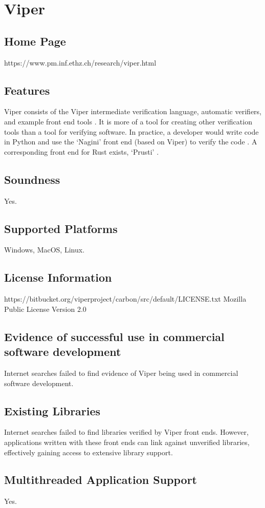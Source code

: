 \documentclass[12pt,openany,a4paper]{book}
\begin{document}
\section{Viper}
	\subsection{Home Page}%
https://www.pm.inf.ethz.ch/research/viper.html
	\subsection{Features}
		Viper consists of the Viper intermediate verification language, automatic verifiers, and example front end tools \cite{viper01}. It is more of a tool for creating other verification tools than a tool for verifying software. In practice, a developer would write code in Python and use the `Nagini' front end (based on Viper) to verify the code \cite{Eilers2018NaginiAS}. A corresponding front end for Rust exists, `Prusti' \cite{AstrauskasMuellerPoliSummers19}.
	\subsection{Soundness}
		Yes.
	\subsection{Supported Platforms}
		Windows, MacOS, Linux\cite{JuhaszUri2014VAVI}.
	\subsection{License Information}
	https://bitbucket.org/viperproject/carbon/src/default/LICENSE.txt
		Mozilla Public License Version 2.0\cite{viperlicense}
	\subsection{Evidence of successful use in commercial software development}
		Internet searches failed to find evidence of Viper being used in commercial software development.
	\subsection{Existing Libraries}
		Internet searches failed to find libraries verified by Viper front ends. However, applications written with these front ends can link against unverified libraries, effectively gaining access to extensive library support.
	\subsection{Multithreaded Application Support}
	Yes.
\end{document}

